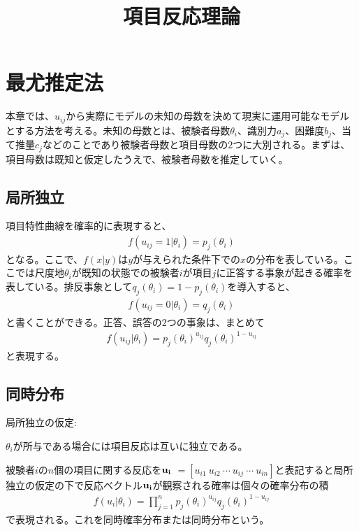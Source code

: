 \documentclass[12pt]{jarticle}
\title{項目反応理論}
\begin{document}
\maketitle
\section{最尤推定法}
本章では、$u_{ij}$から実際にモデルの未知の母数を決めて現実に運用可能なモデルとする方法を考える。未知の母数とは、被験者母数$\theta_i$、識別力$a_j$、困難度$b_j$、当て推量$c_j$などのことであり被験者母数と項目母数の$2$つに大別される。まずは、項目母数は既知と仮定したうえで、被験者母数を推定していく。
\subsection{局所独立}
項目特性曲線を確率的に表現すると、
\begin{eqnarray}
  \label{00}
  \displaystyle f(u_{ij} = 1|\theta_i) = p_{j}(\theta_i)
\end{eqnarray}
となる。ここで、$\displaystyle f(x|y)$は$y$が与えられた条件下での$\displaystyle x$の分布を表している。ここでは尺度地$\displaystyle \theta_i$が既知の状態での被験者$\displaystyle i$が項目$\displaystyle j$に正答する事象が起きる確率を表している。排反事象として$\displaystyle q_j(\theta_i) = 1 - p_j(\theta_i)$を導入すると、
\begin{eqnarray}
  \label{01}
  \displaystyle f(u_{ij} = 0|\theta_i) = q_{j}(\theta_i)
\end{eqnarray}
と書くことができる。正答、誤答の$2$つの事象は、まとめて
\begin{eqnarray}
  \label{02}
  \displaystyle f(u_{ij}|\theta_i) = p_{j}(\theta_i)^{u_{ij}} q_{j}(\theta_i)^{1 - u_{ij}}
\end{eqnarray}
と表現する。
\subsection{同時分布}
 局所独立の仮定:

$\displaystyle \theta_i$が所与である場合には項目反応は互いに独立である。

被験者$i$の$n$個の項目に関する反応を$\displaystyle \bf u_i$ $\displaystyle = [u_{i1}\ u_{i2}\ \cdots\  u_{ij}\  \cdots\  u_{in}]$と表記すると局所独立の仮定の下で反応ベクトル$\displaystyle \bf u_i$が観察される確率は個々の確率分布の積
\begin{eqnarray}
  \label{03}
  \displaystyle f(u_{i}|\theta_i) =\prod_{j = 1}^{n} p_{j}(\theta_i)^{u_{ij}} q_{j}(\theta_i)^{1 - u_{ij}}
\end{eqnarray}
で表現される。これを同時確率分布または同時分布という。
\end{document}

